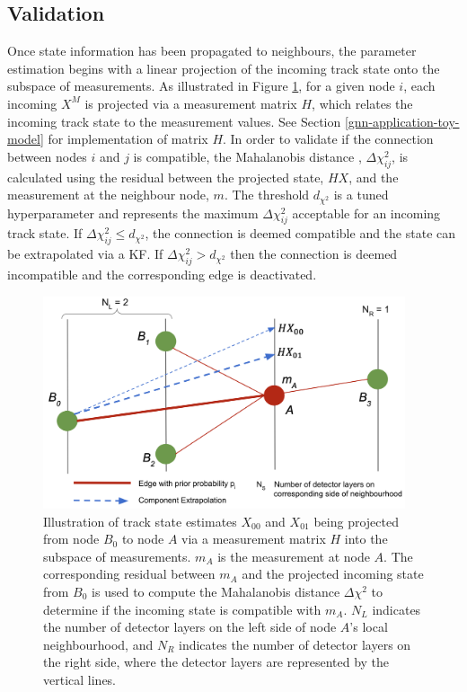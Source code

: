 \subsection{Validation}
Once state information has been propagated to neighbours, the parameter estimation begins with a linear projection of the incoming track state onto the subspace of measurements. As illustrated in Figure \ref{fig:extrapolation}, for a given node $i$, each incoming $X^M$ is projected via a measurement matrix $H$, which relates the incoming track state to the measurement values. See Section \ref{gnn-application-toy-model} for implementation of matrix $H$. In order to validate if the connection between nodes $i$ and $j$ is compatible, the Mahalanobis distance \cite{mahalanobis-distance}, $\Delta \chi^{2}_{ij}$, is calculated using the residual between the projected state, $HX$, and the measurement at the neighbour node, $m$. The threshold $d_{\chi^{2}}$ is a tuned hyperparameter and represents the maximum $\Delta \chi^{2}_{ij}$ acceptable for an incoming track state. If $\Delta \chi^{2}_{ij} \leq d_{\chi^{2}}$, the connection is deemed compatible and the state can be extrapolated via a KF. If $\Delta \chi^{2}_{ij} > d_{\chi^{2}}$ then the connection is deemed incompatible and the corresponding edge is deactivated.

\begin{figure}[H]
        \centering
        \includegraphics[width=0.95\textwidth]{images/5-gnn-algorithm/gnn-extrapolation.png}
        \caption{Illustration of track state estimates $X_{00}$ and $X_{01}$ being projected from node $B_0$ to node $A$ via a measurement matrix $H$ into the subspace of measurements. $m_A$ is the measurement at node $A$. The corresponding residual between $m_A$ and the projected incoming state from $B_0$ is used to compute the Mahalanobis distance $\Delta \chi^{2}$ to determine if the incoming state is compatible with $m_A$. $N_L$ indicates the number of detector layers on the left side of node $A$'s local neighbourhood, and $N_R$ indicates the number of detector layers on the right side, where the detector layers are represented by the vertical lines.}
        \label{fig:extrapolation}%
\end{figure}


